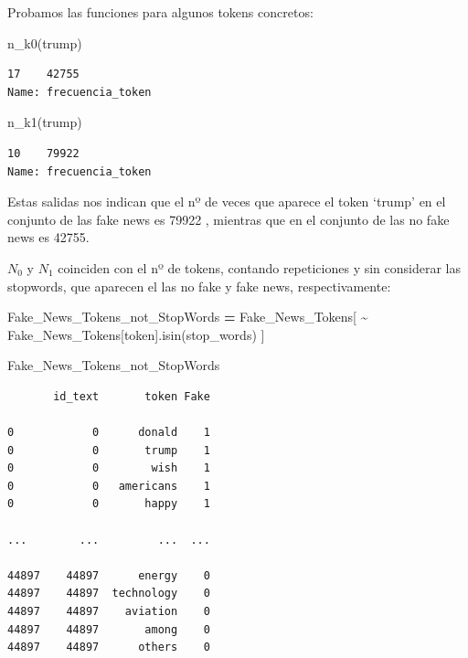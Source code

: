 \documentclass[
  11pt,
  a4paper,
]{article}
\newenvironment{Shaded}{\begin{snugshade}}{\end{snugshade}}
\newcommand{\NormalTok}[1]{#1}
\newcommand{\OperatorTok}[1]{\textcolor[rgb]{0.81,0.36,0.00}{\textbf{#1}}}
\newcommand{\StringTok}[1]{\textcolor[rgb]{0.31,0.60,0.02}{#1}}
\begin{document}
Probamos las funciones para algunos tokens concretos:

\begin{Shaded}
\begin{Highlighting}[]
\NormalTok{n\_k0(}\StringTok{\textquotesingle{}trump\textquotesingle{}}\NormalTok{) }
\end{Highlighting}
\end{Shaded}

\begin{verbatim}
17    42755
Name: frecuencia_token 
\end{verbatim}

\begin{Shaded}
\begin{Highlighting}[]
\NormalTok{n\_k1(}\StringTok{\textquotesingle{}trump\textquotesingle{}}\NormalTok{) }
\end{Highlighting}
\end{Shaded}

\begin{verbatim}
10    79922
Name: frecuencia_token 
\end{verbatim}

Estas salidas nos indican que el nº de veces que aparece el token
`trump' en el conjunto de las fake news es 79922 , mientras que en el
conjunto de las no fake news es 42755.

\(N_0\) y \(N_1\) coinciden con el nº de tokens, contando repeticiones y
sin considerar las stopwords, que aparecen el las no fake y fake news,
respectivamente:

\begin{Shaded}
\begin{Highlighting}[]
\NormalTok{Fake\_News\_Tokens\_not\_StopWords }\OperatorTok{=}\NormalTok{ Fake\_News\_Tokens[ }\OperatorTok{\textasciitilde{}}\NormalTok{ Fake\_News\_Tokens[}\StringTok{\textquotesingle{}token\textquotesingle{}}\NormalTok{].isin(stop\_words) ]}

\NormalTok{Fake\_News\_Tokens\_not\_StopWords}
\end{Highlighting}
\end{Shaded}

\begin{verbatim}
       id_text       token Fake
       
0            0      donald    1
0            0       trump    1
0            0        wish    1
0            0   americans    1
0            0       happy    1

...        ...         ...  ...

44897    44897      energy    0
44897    44897  technology    0
44897    44897    aviation    0
44897    44897       among    0
44897    44897      others    0
\end{verbatim}
\end{document}
